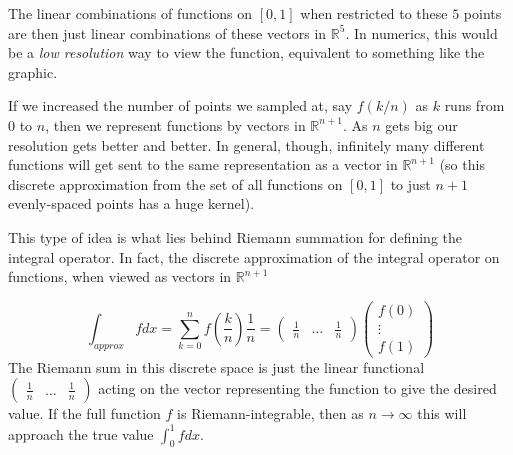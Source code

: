 \documentclass[../master.tex]{subfiles}
\begin{document}
	The linear combinations of functions on $[0,1]$ when restricted to these $5$ points are then just linear combinations of these vectors in $\mathbb{R}^5$. In numerics, this would be a \emph{low resolution} way to view the function, equivalent to something like the graphic.

	
	If we increased the number of points we sampled at, say $f(k/n)$ as $k$ runs from $0$ to $n$, then we represent functions by vectors in $\mathbb{R}^{n+1}$. As $n$ gets big our resolution gets better and better. In general, though, infinitely many different functions will get sent to the same representation as a vector in $\mathbb{R}^{n+1}$ (so this discrete approximation from the set of all functions on $[0,1]$ to just $n+1$ evenly-spaced points has a huge kernel).
	
	This type of idea is what lies behind Riemann summation for defining the integral operator. In fact, the discrete approximation of the integral operator on functions, when viewed as vectors in $\mathbb{R}^{n+1}$
	\begin{example}
	\end{example}
	\begin{equation*}
		\int_{approx} f dx = \sum_{k=0}^n f\left(\frac{k}{n}\right) \frac{1}{n} = 
		\begin{pmatrix}
			\frac{1}{n} & \dots & \frac{1}{n}
		\end{pmatrix}
		\begin{pmatrix}
			f(0) \\
			\vdots \\
			f(1)
		\end{pmatrix}
	\end{equation*}
	The Riemann sum in this discrete space is just the linear functional $\begin{pmatrix}
			\frac{1}{n} & \dots & \frac{1}{n}
		\end{pmatrix}$ acting on the vector representing the function to give the desired value. If the full function $f$ is Riemann-integrable, then as $n\rightarrow \infty$  this will approach the true value $\int_0^1 f dx$. 
		
\end{document}
